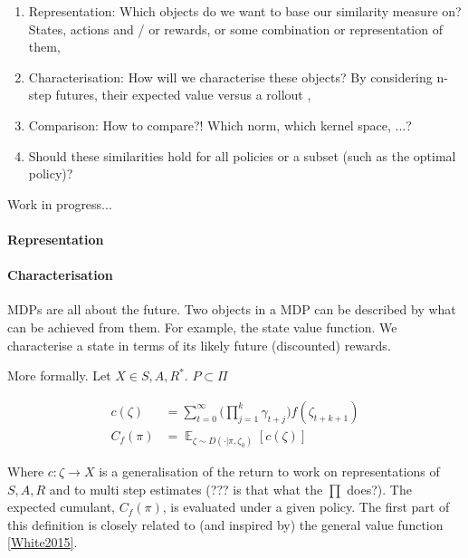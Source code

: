 \begin{enumerate}
  \tightlist
  \item Representation: Which objects do we want to base our similarity measure on? States, actions and / or rewards, or some combination or representation of them,
  \item Characterisation: How will we characterise these objects? By considering n-step futures, their expected value versus a rollout \footnotemark[9],
  \item Comparison: How to compare?! Which norm, which kernel space, ...?
  \item Should these similarities hold for all policies or a subset (such as the optimal policy)?
\end{enumerate}


{\color{red}Work in progress...}

\paragraph{Representation}



\paragraph{Characterisation}

MDPs are all about the future. Two objects in a MDP can be described by what can
be achieved from them. For example, the state value function. We characterise a state in terms of
its likely future (discounted) rewards.

More formally. Let $X \in {S, A, R}^{* }$. $P \subset \Pi$

\begin{align*}
c(\zeta) &= \sum_{t=0}^{\infty} \big( \prod_{j=1}^k\gamma_{t+j}\big)  f(\zeta_{t+k+1}) \\
C_f(\pi) &= \mathop{\mathbb E}_{\zeta \sim D(\cdot | \pi, \zeta_0)} [c(\zeta)]
\end{align*}

Where $c: \zeta \to X$ is a generalisation of the return to work on representations of $S, A, R$ and to multi step estimates (??? is that what the $\prod$ does?).
The expected cumulant, $C_f(\pi)$, is evaluated under a given policy.
The first part of this definition is closely related to (and inspired by) the general value function \ref{White2015}.


